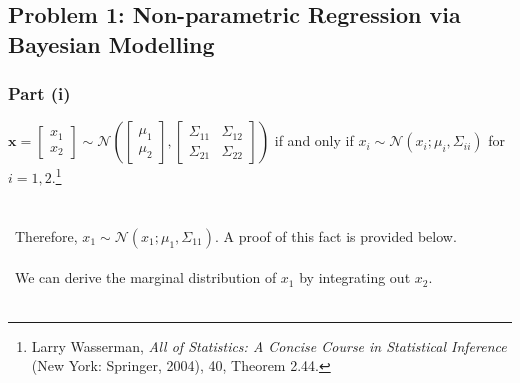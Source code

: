 \documentclass[twoside,11pt]{homework}
\date{\today}
\DeclarePairedDelimiter{\2norm}{\lVert}{\rVert^2_2}
\newcommand{\1}[1]{\mathds{1}\left[#1\right]}
\begin{document}
\maketitle

\subsection*{Problem 1: Non-parametric Regression via Bayesian Modelling}
\vspace{0.2in}

\subsubsection*{Part (i)} 
$\textbf{x} =  \begin{bmatrix} x_1 \\ x_2 \end{bmatrix} \sim \mathcal{N}\left(\begin{bmatrix} \mu_1 \\ \mu_2 \end{bmatrix}, \begin{bmatrix} \Sigma_{11} & \Sigma_{12} \\ \Sigma_{21} & \Sigma_{22} \end{bmatrix} \right)$ if and only if $x_i \sim \mathcal{N}\left(x_i; \mu_i, \Sigma_{ii}\right)$ for $ i = 1, 2$.\footnote{Larry Wasserman, \textit{All of Statistics: A Concise Course in Statistical Inference} (New York: Springer, 2004), 40, Theorem 2.44.} \\\ \\\ \\\
Therefore, $x_1 \sim \mathcal{N}\left(x_1; \mu_1, \Sigma_{11}\right)$. A proof of this fact is provided below. \\\ \\\
We can derive the marginal distribution of $x_1$ by integrating out $x_2$.\\ \\
\end{document}
